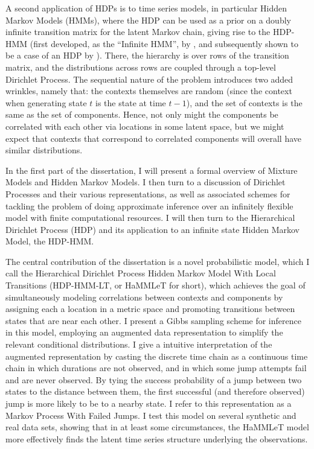 A second application of HDPs is to time series
models, in particular Hidden Markov Models (HMMs), where the HDP can be used
as a prior on a doubly infinite transition matrix for the latent Markov
chain, giving rise to the HDP-HMM (first developed, as the ``Infinite
HMM'', by \cite{beal2001infinite}, 
and subsequently shown to be a case of an HDP by \citet{teh2006hierarchical}).  
There, the hierarchy is over rows of the transition matrix,
and the distributions across rows are coupled through a top-level
Dirichlet Process.  The sequential nature of the problem introduces two
added wrinkles, namely that: the contexts themselves are random (since
the context when generating state $t$ is the state at time $t-1$),
and the set of contexts is the same as the set of components.  Hence,
not only might the components be correlated with each other via
locations in some latent space, but we might expect that contexts that
correspond to correlated components will overall have similar
distributions.  

In the first part of the dissertation, I will present a formal overview of
Mixture Models and Hidden Markov Models.  I then turn to a discussion
of Dirichlet Processes and their various representations, as well as
associated schemes for tackling the problem of doing approximate inference over an
infinitely flexible model with finite computational resources.  I will
then turn to the Hierarchical Dirichlet Process (HDP) and its application to
an infinite state Hidden Markov Model, the HDP-HMM.

The central contribution of the dissertation is a novel probabilistic model, which I call the
Hierarchical Dirichlet Process Hidden Markov Model With Local
Transitions (HDP-HMM-LT, or HaMMLeT for short), 
which achieves the goal of simultaneously modeling
correlations between contexts and components by assigning each
a location in a metric space and promoting transitions between states
that are near each other.  I present a Gibbs sampling scheme
for inference in this model, employing an augmented data
representation to simplify the relevant conditional distributions.  I
give a intuitive interpretation of the augmented representation by
casting the discrete time chain as a continuous time chain in which
durations are not observed, and in which some jump attempts fail and
are never observed.  By tying the success probability of a jump
between two states to the distance between them, the first successful
(and therefore observed) jump is more likely to be to a nearby state.
I refer to this representation as a Markov Process With Failed Jumps.
I test this model on several synthetic and real data sets, showing
that in at least some circumstances, the HaMMLeT model more
effectively finds the latent time series structure underlying the observations.



